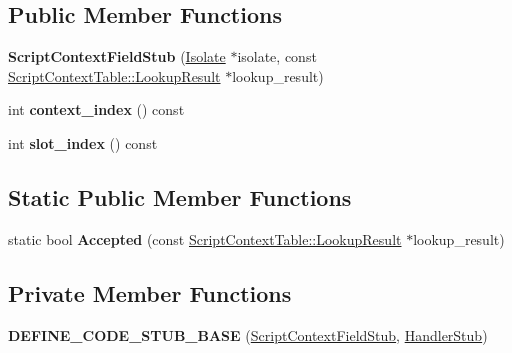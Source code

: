 \subsection*{Public Member Functions}
\begin{DoxyCompactItemize}
\item 
{\bfseries Script\+Context\+Field\+Stub} (\hyperlink{classv8_1_1internal_1_1_isolate}{Isolate} $\ast$isolate, const \hyperlink{structv8_1_1internal_1_1_script_context_table_1_1_lookup_result}{Script\+Context\+Table\+::\+Lookup\+Result} $\ast$lookup\+\_\+result)\hypertarget{classv8_1_1internal_1_1_script_context_field_stub_af512848676b202405aadbd2e0203db8a}{}\label{classv8_1_1internal_1_1_script_context_field_stub_af512848676b202405aadbd2e0203db8a}

\item 
int {\bfseries context\+\_\+index} () const \hypertarget{classv8_1_1internal_1_1_script_context_field_stub_ad1336a482f572fd3bfb956f6399a95e2}{}\label{classv8_1_1internal_1_1_script_context_field_stub_ad1336a482f572fd3bfb956f6399a95e2}

\item 
int {\bfseries slot\+\_\+index} () const \hypertarget{classv8_1_1internal_1_1_script_context_field_stub_a8117d0018a929954039d4b587fdac1c0}{}\label{classv8_1_1internal_1_1_script_context_field_stub_a8117d0018a929954039d4b587fdac1c0}

\end{DoxyCompactItemize}
\subsection*{Static Public Member Functions}
\begin{DoxyCompactItemize}
\item 
static bool {\bfseries Accepted} (const \hyperlink{structv8_1_1internal_1_1_script_context_table_1_1_lookup_result}{Script\+Context\+Table\+::\+Lookup\+Result} $\ast$lookup\+\_\+result)\hypertarget{classv8_1_1internal_1_1_script_context_field_stub_a4e810029974e0ae5df5641c2723ca3c7}{}\label{classv8_1_1internal_1_1_script_context_field_stub_a4e810029974e0ae5df5641c2723ca3c7}

\end{DoxyCompactItemize}
\subsection*{Private Member Functions}
\begin{DoxyCompactItemize}
\item 
{\bfseries D\+E\+F\+I\+N\+E\+\_\+\+C\+O\+D\+E\+\_\+\+S\+T\+U\+B\+\_\+\+B\+A\+SE} (\hyperlink{classv8_1_1internal_1_1_script_context_field_stub}{Script\+Context\+Field\+Stub}, \hyperlink{classv8_1_1internal_1_1_handler_stub}{Handler\+Stub})\hypertarget{classv8_1_1internal_1_1_script_context_field_stub_a9671511a8cb5e03aa45274d3e8f8be6b}{}\label{classv8_1_1internal_1_1_script_context_field_stub_a9671511a8cb5e03aa45274d3e8f8be6b}

\end{DoxyCompactItemize}
